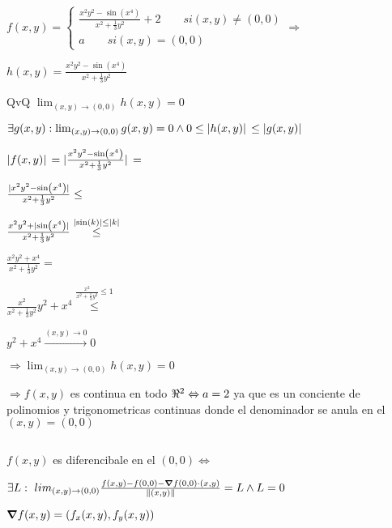 \documentclass[../parcial.tex]{subfiles}
\begin{document}
    $f(x,y) = \left\{
        \begin{array}{ll}
            \frac{x^2y^2-\sin(x^4)}{x^2 + \frac{1}{3} y^2} + 2 \qquad si (x,y) \neq (0,0) \\
            a \qquad si (x,y) = (0,0) 
        \end{array}
    \right. \Rightarrow$

    $ h(x,y) = \frac{x^2y^2-\sin(x^4)}{x^2 + \frac{1}{3} y^2} $

    QvQ $ \lim_{(x,y) \to (0,0)} h(x,y) = 0 $

    $ \exists g(x,y) : \lim_{(x,y) \to (0,0)} g(x,y) = 0 \wedge 0 \leq \abs*{h(x,y)} \leq \abs*{g(x,y)}$

    $ \abs*{f(x,y)} = \abs*{\frac{x^2y^2-\sin(x^4)}{x^2 + \frac{1}{3} y^2}} = $

    $ \frac{\abs*{x^2y^2-\sin(x^4)}}{x^2 + \frac{1}{3} y^2} \leq $

    $ \frac{x^2y^2+\abs*{\sin(x^4)}}{x^2 + \frac{1}{3} y^2} \stackrel{\abs*{\sin(k)} \leq \abs*{k}}{\leq} $

    $ \frac{x^2y^2+x^4}{x^2 + \frac{1}{3} y^2} = $

    $ \frac{x^2}{x^2 + \frac{1}{3} y^2}y^2+x^4 \stackrel{\frac{x^2}{x^2 + \frac{1}{3} y^2} \leq 1}{\leq} $

    $ y^2+x^4 \stackrel{(x,y) \to 0 }{\to } 0$

    $ \Rightarrow \lim_{(x,y) \to (0,0)} h(x,y) = 0 $

    $ \Rightarrow f(x,y) $ es continua en todo $\real^2 \Leftrightarrow a = 2$ ya que es un conciente de polinomios y trigonometricas continuas donde el denominador se anula en el $(x,y) = (0,0)$

    $ $

    $ f(x,y) $ es diferencibale en el $(0,0) \Leftrightarrow$

    $ \exists L :\ lim_{(x,y) \to (0,0)} \frac{f(x,y) - f(0,0) - \grad f(0,0)\cdot(x,y) }{\norm*{(x,y)}} = L \wedge L = 0 $

    $ \grad f(x,y) = (f_x(x,y), f_y(x,y)) $
\end{document}
